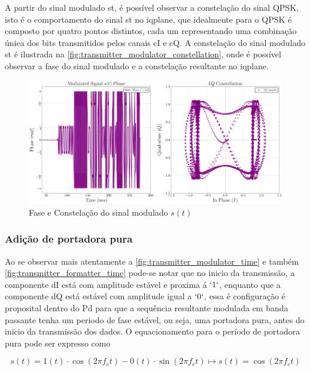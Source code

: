 A partir do sinal modulado \gls{st}, é possível observar a constelação do sinal \gls{QPSK}, isto é o comportamento do sinal \gls{st} no \gls{iqplane}, que idealmente para o \gls{QPSK} é composto por quatro pontos distintos, cada um representando uma combinação única dos bits transmitidos pelos canais \gls{cI} e \gls{cQ}. A constelação do sinal modulado \gls{st} é ilustrada na \autoref{fig:transmitter_modulator_constellation}, onde é possível observar a fase do sinal modulado e a constelação resultante no \gls{iqplane}.


\begin{figure}[H]
	\centering
	\caption{Fase e Constelação do sinal modulado $s(t)$}\label{fig:transmitter_modulator_constellation}
	\includegraphics[width=\linewidth]{assets/cap3/transmitter_modulator_constellation.pdf}
\end{figure}


\subsubsection{Adição de portadora pura}

Ao se observar mais atentamente a \ref{fig:transmitter_modulator_time} e também \ref{fig:transmitter_formatter_time} pode-se notar que no inicio da transmissão, a componente \gls{dI} está com amplitude estável e proxima á $`1`$, enquanto que a componente \gls{dQ} está estável com amplitude igual a $`0`$, essa é configuração é proposital dentro do \gls{Pd} para que a sequência resultante modulada em banda passante tenha um periodo de fase estável, ou seja, uma portadora pura, antes do inicio da transmissão dos dados. O equacionamento para o período de portadora pura pode ser expresso como

\begin{equation}
    s(t) = 1(t) \cdot \cos(2\pi f_c t) - 0(t) \cdot \sin(2\pi f_c t) \mapsto s(t) = \cos(2\pi f_c t)
\end{equation}

